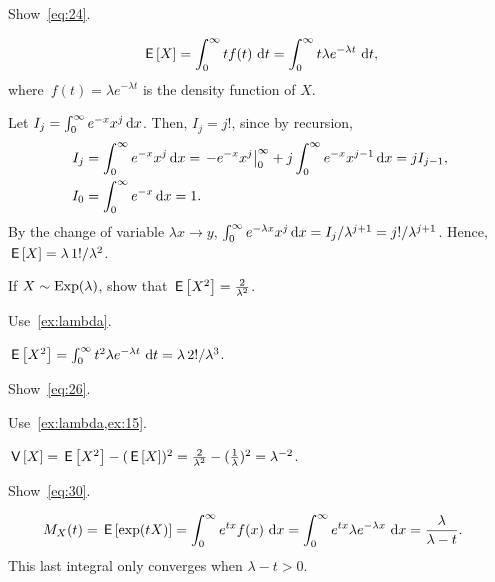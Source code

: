 \begin{exercise}\label{ex:lambda}
Show~\cref{eq:24}.
\begin{hint}
 \begin{equation*}
 \,\mathsf{E}\left[X\right] = \int_0^\infty t f(t)\, \,\textrm{d}t =
 \int_0^\infty t \lambda e^{-\lambda t}\, \,\textrm{d}t,
 \end{equation*}
 where~$f(t)=\lambda e^{-\lambda t}$ is the density function of $X$.
\end{hint}
\begin{solution}
Let $I_j = \int_0^\infty e^{- x} x^j \,\textrm{d}x$. Then, $I_j = {j!}$, since by recursion,
\begin{align*}
I_j &=  \int_0^\infty e^{- x} x^j \,\textrm{d}x = \left. -e^{-x} x^j\right|_0^\infty + j  \int_0^\infty e^{- x} x^{j-1} \,\textrm{d}x = j I_{j-1}, \\
I_0 &= \int_0^\infty e^{-x} \,\textrm{d}x = 1.
\end{align*}
By the change of variable $\lambda x \to y$, $\int_0^\infty e^{- \lambda x} x^j \,\textrm{d}x = I_j/\lambda^{j+1} = j!/\lambda^{j+1}$.
Hence, $\,\mathsf{E}\left[X\right] = \lambda\, 1!/\lambda^2$.
\end{solution}
\end{exercise}

\begin{exercise}\label{ex:15}
 If 
 $X\sim\operatorname{Exp}(\lambda)$, show that $\,\mathsf{E}\left[X^2\right] = \frac{2}{\lambda^2}$.
\begin{hint}
Use~\cref{ex:lambda}.
\end{hint}
\begin{solution}
$\,\mathsf{E}\left[X^2\right] =  \int_0^\infty t^2  \lambda e^{-\lambda t}\, \,\textrm{d}t = \lambda\, 2!/\lambda^3$.
\end{solution}
\end{exercise}


\begin{exercise}\label{ex:86}
Show~\cref{eq:26}.
\begin{hint} Use~\cref{ex:lambda,ex:15}.
\end{hint}
\begin{solution}
$\,\mathsf{V}\left[X\right] = \,\mathsf{E}\left[X^2\right] - (\,\mathsf{E}\left[X\right])^2 = \frac{2}{\lambda^2} - (\frac{1}{\lambda})^2 = \lambda^{-2}$.
\end{solution}
\end{exercise}


\begin{exercise}\label{ex:11}
Show~\cref{eq:30}.
\begin{solution}
 \begin{align*}
 M_X(t) &= \,\mathsf{E}\left[\exp(t X)\right]
=\int_0^\infty e^{tx} f(x) \,\,\textrm{d}x
=\int_0^\infty e^{tx} \lambda e^{-\lambda x} \,\,\textrm{d}x =\frac{\lambda}{\lambda -t}.
 \end{align*}
This last integral only converges when $\lambda -t > 0$.
\end{solution}
\end{exercise}

